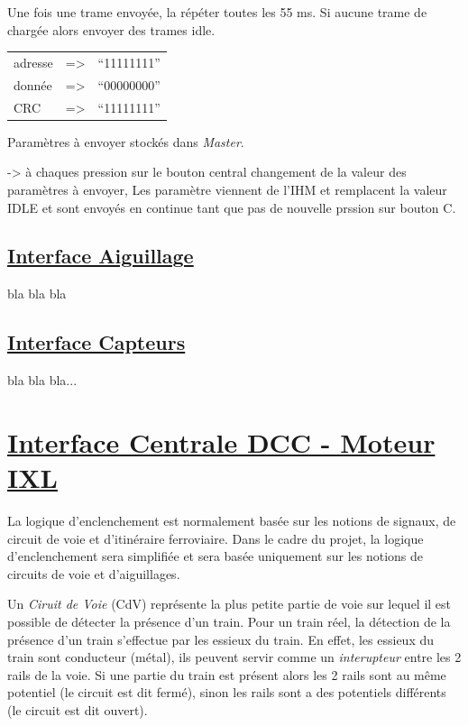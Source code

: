 \medskip
Une fois une trame envoyée, la répéter toutes les 55 ms. Si aucune
trame de chargée alors envoyer des trames idle.

\medskip
\begin{center}
\begin{tabular}{lll}
adresse & => & ``11111111'' \\
donnée  & => & ``00000000'' \\
CRC     & => & ``11111111'' \\
\end{tabular}
\end{center}

\medskip
Paramètres à envoyer stockés dans \emph{Master}.


-> à chaques pression sur le bouton central changement de la valeur
des paramètres à envoyer, Les paramètre viennent de l'IHM et
remplacent la valeur IDLE et sont envoyés en continue tant que pas de
nouvelle prssion sur bouton C.

\bigskip
\subsection{\underline{Interface Aiguillage}}
\label{sec:int_aig}

bla bla bla

\subsection{\underline{Interface Capteurs}}
\label{sec:int_cap}

bla bla bla...


\newpage
\section{\underline{Interface Centrale DCC - Moteur IXL}}
\label{sec:int_ixl}   

La logique d'enclenchement est normalement basée sur les notions de signaux, de
circuit de voie et d'itinéraire ferroviaire. Dans le cadre du projet,
la logique d'enclenchement sera simplifiée et sera basée uniquement sur les
notions de circuits de voie et d'aiguillages. 

\medskip
Un \emph{Ciruit de Voie} (CdV) représente la plus petite partie de
voie sur lequel il est possible de détecter la présence d'un
train. Pour un train réel, la détection de la présence d'un train
s'effectue par les essieux du train. En effet, les essieux du train
sont conducteur (métal), ils peuvent servir comme un
\emph{interupteur} entre les 2 rails de la voie. Si une partie du
train est présent alors les 2 rails sont au même potentiel (le circuit
est dit fermé), sinon les rails sont a des potentiels différents (le
circuit est dit ouvert).

